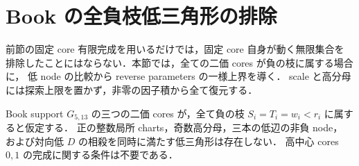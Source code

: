 \section{Book の全負枝低三角形の排除}
\label{bk20:negative-section}

前節の固定 core 有限完成を用いるだけでは，固定 core 自身が動く無限集合を
排除したことにはならない．本節では，全ての二価 cores が負の枝に属する場合に，
低 node の比較から reverse parameters の一様上界を導く．
scale と高分母には探索上限を置かず，非零の因子積から全て復元する．

\begin{theorem}
\label{bk20:no-all-negative}
Book support $G_{5,13}$ の三つの二価 cores が，全て負の枝
$S_i=T_i=w_i<r_i$ に属すると仮定する．
正の整数局所 charts，奇数高分母，三本の低辺の非負 node，
および対向低 $D$ の相殺を同時に満たす低三角形は存在しない．
高中心 cores $0,1$ の完成に関する条件は不要である．
\end{theorem}


